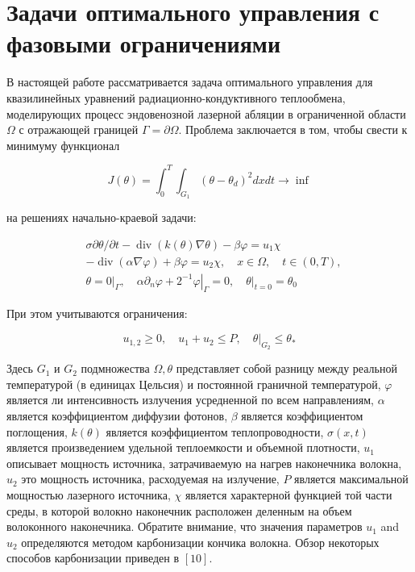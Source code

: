 \section{
    Задачи оптимального управления с фазовыми ограничениями
}\label{sec:ch3:sec2}
%
В настоящей работе рассматривается задача оптимального управления для квазилинейных
уравнений радиационно-кондуктивного теплообмена, моделирующих процесс эндовенозной
лазерной абляции в ограниченной области $\Omega$ с отражающей границей $\Gamma=\partial\Omega$.
Проблема заключается в том, чтобы свести к минимуму функционал

\[ J(\theta)=\int_{0}^{T} \int_{G_{1}}\left(\theta-\theta_{d}\right)^{2} d x d t \rightarrow \inf \]

на решениях начально-краевой задачи:

\[
    \begin{aligned}
        &\sigma \partial \theta / \partial t-\operatorname{div}(k(\theta)
        \nabla \theta)-\beta \varphi=u_{1} \chi \\
        &-\operatorname{div}(\alpha \nabla \varphi)+\beta \varphi=u_{2}
        \chi, \quad x \in \Omega, \quad t \in(0, T), \\
        &\theta=\left.0\right|_{\Gamma}, \quad \alpha \partial_{n}
        \varphi+\left.2^{-1} \varphi\right|_{\Gamma}=0,\left.\quad \theta\right|_{t=0}=\theta_{0}
    \end{aligned}
\]

При этом учитываются ограничения:

\[
    u_{1,2} \geq 0, \quad u_{1}+u_{2} \leq P,\left.\quad \theta\right|_{G_{2}} \leq \theta_{*}
\]

Здесь $G_{1}$ и $G_{2}$ подмножества $\Omega, \theta$
представляет собой разницу между реальной температурой
(в единицах Цельсия) и постоянной граничной температурой,
$\varphi$ является ли интенсивность излучения усредненной по всем направлениям, $\alpha$
является коэффициентом диффузии фотонов, $\beta$ является коэффициентом поглощения,
$k(\theta)$ является коэффициентом теплопроводности, $\sigma(x, t)$
является произведением удельной теплоемкости и объемной плотности, $u_{1}$
описывает мощность источника, затрачиваемую на нагрев наконечника волокна, $u_{2}$
это мощность источника, расходуемая на излучение,
$P$ является максимальной мощностью лазерного источника, $\chi$
является характерной функцией той части среды, в которой волокно
наконечник расположен деленным на объем волоконного наконечника.
Обратите внимание, что значения параметров $u_{1}$ and $u_{2}$
определяются методом карбонизации кончика волокна.
Обзор некоторых способов карбонизации приведен в $[10]$.

